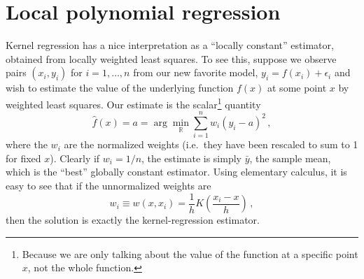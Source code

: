 \documentclass[11pt]{article}
\begin{document}
\section{Local polynomial regression}

Kernel regression has a nice interpretation as a ``locally constant'' estimator, obtained from locally weighted least squares.  To see this, suppose we observe pairs $(x_i, y_i)$ for $i = 1, \ldots, n$ from our new favorite model, $y_i = f(x_i) + \epsilon_i$ and wish to estimate the value of the underlying function $f(x)$ at some point $x$ by weighted least squares.  Our estimate is the scalar\footnote{Because we are only talking about the value of the function at a specific point $x$, not the whole function.} quantity
$$
\hat{f}(x) = a = \arg \min_{\mathbb{R}} \sum_{i=1}^n w_i (y_i - a)^2 \, ,
$$
where the $w_i$ are the normalized weights (i.e.~they have been rescaled to sum to 1 for fixed $x$).  Clearly if $w_i = 1/n$, the estimate is simply $\bar{y}$, the sample mean, which is the ``best'' globally constant estimator.  Using elementary calculus, it is easy to see that if the unnormalized weights are
$$
w_i \equiv w(x, x_i) = \frac{1}{h} K \left( \frac{x_i - x}{h} \right)  \, ,
$$
then the solution is exactly the kernel-regression estimator.
\end{document}
